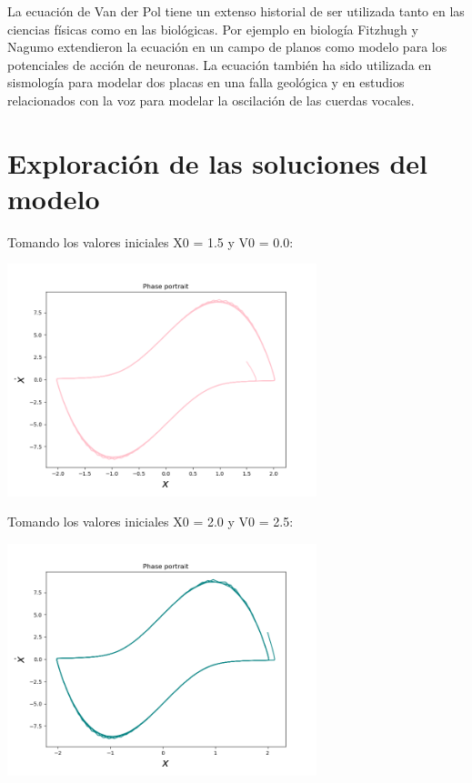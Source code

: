 \documentclass{article} %
\begin{document}
\vspace{0.5 cm}

La ecuación de Van der Pol tiene un extenso historial de ser utilizada tanto en las ciencias físicas como en las biológicas. Por ejemplo en biología Fitzhugh y Nagumo extendieron la ecuación en un campo de planos como modelo para los potenciales de acción de neuronas. La ecuación también ha sido utilizada en sismología para modelar dos placas en una falla geológica y en estudios relacionados con la voz para modelar la oscilación de las cuerdas vocales.

\section{Exploración de las soluciones del modelo}

Tomando los valores iniciales X0 = 1.5 y V0 = 0.0: 

\begin{center}
	\includegraphics[width=9cm]{php1.png}
\end{center}

Tomando los valores iniciales X0 = 2.0 y V0 = 2.5: 

\begin{center}
	\includegraphics[width=9cm]{php2.png}
\end{center}
\end{document}
